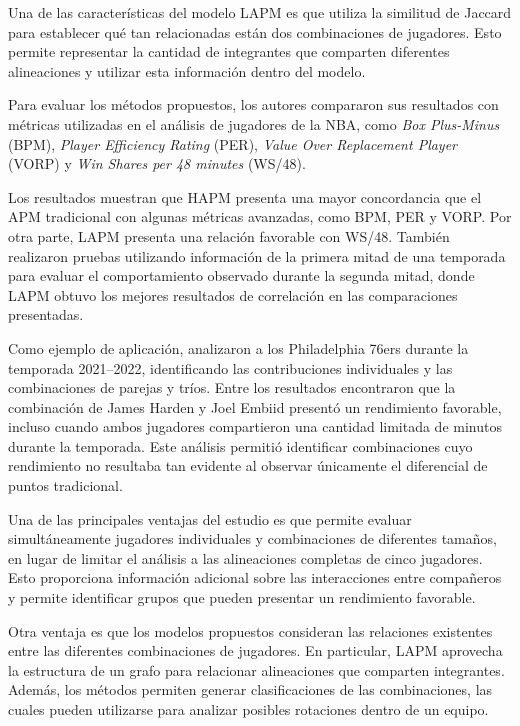 Una de las características del modelo LAPM es que utiliza la similitud de Jaccard para establecer qué tan relacionadas están dos combinaciones de jugadores. Esto permite representar la cantidad de integrantes que comparten diferentes alineaciones y utilizar esta información dentro del modelo.

Para evaluar los métodos propuestos, los autores compararon sus resultados con métricas utilizadas en el análisis de jugadores de la NBA, como \textit{Box Plus-Minus} (BPM), \textit{Player Efficiency Rating} (PER), \textit{Value Over Replacement Player} (VORP) y \textit{Win Shares per 48 minutes} (WS/48).

Los resultados muestran que HAPM presenta una mayor concordancia que el APM tradicional con algunas métricas avanzadas, como BPM, PER y VORP. Por otra parte, LAPM presenta una relación favorable con WS/48. También realizaron pruebas utilizando información de la primera mitad de una temporada para evaluar el comportamiento observado durante la segunda mitad, donde LAPM obtuvo los mejores resultados de correlación en las comparaciones presentadas.

Como ejemplo de aplicación, analizaron a los Philadelphia 76ers durante la temporada 2021--2022, identificando las contribuciones individuales y las combinaciones de parejas y tríos. Entre los resultados encontraron que la combinación de James Harden y Joel Embiid presentó un rendimiento favorable, incluso cuando ambos jugadores compartieron una cantidad limitada de minutos durante la temporada. Este análisis permitió identificar combinaciones cuyo rendimiento no resultaba tan evidente al observar únicamente el diferencial de puntos tradicional.

Una de las principales ventajas del estudio es que permite evaluar simultáneamente jugadores individuales y combinaciones de diferentes tamaños, en lugar de limitar el análisis a las alineaciones completas de cinco jugadores. Esto proporciona información adicional sobre las interacciones entre compañeros y permite identificar grupos que pueden presentar un rendimiento favorable.

Otra ventaja es que los modelos propuestos consideran las relaciones existentes entre las diferentes combinaciones de jugadores. En particular, LAPM aprovecha la estructura de un grafo para relacionar alineaciones que comparten integrantes. Además, los métodos permiten generar clasificaciones de las combinaciones, las cuales pueden utilizarse para analizar posibles rotaciones dentro de un equipo.

